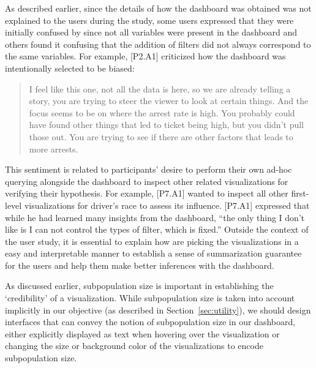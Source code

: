 \par As described earlier, since the details of how the dashboard was obtained was not explained to the users during the study, some users expressed that they were initially confused by \system since not all variables were present in the dashboard and others found it confusing that the addition of filters did not always correspond to the same variables. For example, [P2.A1] criticized how the dashboard was intentionally selected to be biased: 
\begin{quote}
I feel like this one, not all the data is here, so we are already telling a story, you are trying to steer the viewer to look at certain things. And the focus seems to be on where the arrest rate is high. You probably could have found other things that led to ticket being high, but you didn't pull those out. You are trying to see if there are other factors that leads to more arrests.
\end{quote}
\npar This sentiment is related to participants' desire to perform their own ad-hoc querying alongside the dashboard to inspect other related visualizations for verifying their hypothesis. For example, [P7.A1] wanted to inspect all other first-level visualizations for driver's race to assess its influence. [P7.A1] expressed that while he had learned many insights from the dashboard, ``the only thing I don't like is I can not control the types of filter, which is fixed.'' Outside the context of the user study, it is essential to explain how \system are picking the visualizations in a easy and interpretable manner to establish a sense of summarization guarantee for the users and help them make better inferences with the dashboard. 
\par As discussed earlier, subpopulation size is important in establishing the `credibility' of a visualization. While subpopulation size is taken into account implicitly in our objective (as described in Section~\ref{sec:utility}), we should design interfaces that can convey the notion of subpopulation size in our dashboard, either explicitly displayed as text when hovering over the visualization or changing the size or background color of the visualizations to encode subpopulation size.
